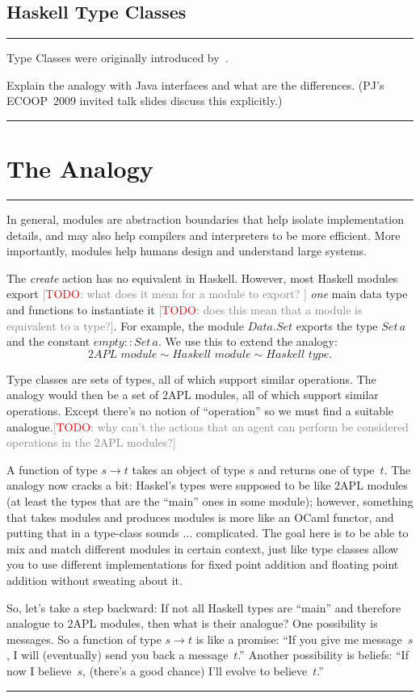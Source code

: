 \documentclass[conference,compsoc]{IEEEtran}
\newcommand{\todo}[1]{{\small \textcolor{gray}{[\textcolor{red}{TODO}: #1]}}}
\newenvironment{notes}{\medskip\hrule\nobreak\smallskip\narrower}{\smallskip\hrule\medskip}
\begin{document}
\subsection{Haskell Type Classes}

\begin{notes}
Type Classes were originally introduced by~\cite{DBLP:conf/popl/WadlerB89}.

Explain the analogy with Java interfaces and what are the differences.
(PJ's ECOOP~2009 invited talk slides discuss this explicitly.)
\end{notes}

\section{The Analogy}

\begin{notes}
In general, modules are abstraction boundaries that help isolate
implementation details, and may also help compilers and interpreters to be
more efficient.  More importantly, modules help humans design and
understand large systems.

The \textit{create} action has no equivalent in Haskell. However, most
Haskell modules export \todo{what does it mean for a module to export?  }
\emph{one} main data type and functions to instantiate it \todo{does this
mean that a module is equivalent to a type?}.  For example, the module
$\mathit{Data}.\mathit{Set}$ exports the type $\mathit{Set}\,a$ and the
constant $\mathit{empty}::\mathit{Set}\,a$. We use this to extend the
analogy: \[ \textit{2APL module} \sim \textit{Haskell module} \sim
\textit{Haskell type}. \]

Type classes are sets of types, all of which support similar operations.
The analogy would then be a set of 2APL modules, all of which support
similar operations. Except there's no notion of ``operation'' so we must
find a suitable analogue.\todo{why can't the actions that an agent can
perform  be considered operations in the 2APL modules?}

A function of type $s\to t$ takes an object of type $s$ and returns one of
type~$t$. The analogy now cracks a bit: Haskel's types were supposed to be
like 2APL modules (at least the types that are the ``main'' ones in some
module); however, something that takes modules and produces modules is more
like an OCaml functor, and putting that in a type-class sounds $\ldots$
complicated. The goal here is to be able to mix and match different modules
in certain context, just like type classes allow you to use different
implementations for fixed point addition and floating point addition
without sweating about it.

So, let's take a step backward: If not all Haskell types are ``main'' and
therefore analogue to 2APL modules, then what is their analogue? One
possibility is messages. So a function of type $s\to t$ is like a promise:
``If you give me message~$s$, I will (eventually) send you back a
message~$t$.'' Another possibility is beliefs: ``If now I believe~$s$,
(there's a good chance) I'll evolve to believe~$t$.''

\end{notes}
\end{document}
